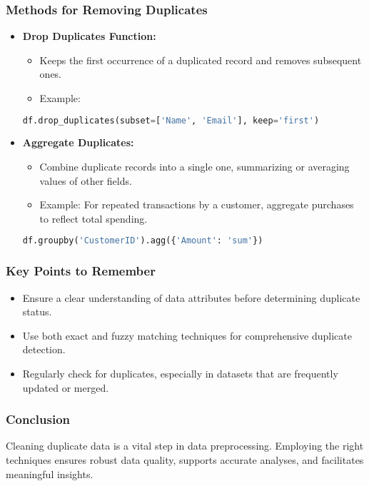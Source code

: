 \documentclass[aspectratio=169]{beamer}
\begin{document}
\begin{frame}[fragile]
  \frametitle{Methods for Removing Duplicates}
  
  \begin{itemize}
    \item \textbf{Drop Duplicates Function:}
      \begin{itemize}
        \item Keeps the first occurrence of a duplicated record and removes subsequent ones.
        \item Example:
      \end{itemize}
      \begin{lstlisting}[language=Python]
df.drop_duplicates(subset=['Name', 'Email'], keep='first')
      \end{lstlisting}
    
    \item \textbf{Aggregate Duplicates:}
      \begin{itemize}
        \item Combine duplicate records into a single one, summarizing or averaging values of other fields.
        \item Example: For repeated transactions by a customer, aggregate purchases to reflect total spending.
      \end{itemize}
      \begin{lstlisting}[language=Python]
df.groupby('CustomerID').agg({'Amount': 'sum'})
      \end{lstlisting}
  \end{itemize}
\end{frame}

\begin{frame}[fragile]
  \frametitle{Key Points to Remember}
  \begin{itemize}
    \item Ensure a clear understanding of data attributes before determining duplicate status.
    \item Use both exact and fuzzy matching techniques for comprehensive duplicate detection.
    \item Regularly check for duplicates, especially in datasets that are frequently updated or merged.
  \end{itemize}
\end{frame}

\begin{frame}[fragile]
  \frametitle{Conclusion}
  Cleaning duplicate data is a vital step in data preprocessing. Employing the right techniques ensures robust data quality, supports accurate analyses, and facilitates meaningful insights.
\end{frame}
\end{document}
